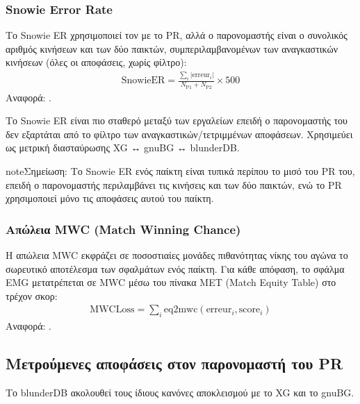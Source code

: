 \documentclass[letterpaper,10pt,greek]{sphinxmanual}
\begin{document}
\subsubsection{Snowie Error Rate}
\label{\detokenize{stats_parity:snowie-error-rate}}
\sphinxAtStartPar
Το Snowie ER χρησιμοποιεί τον  με το PR, αλλά ο παρονομαστής είναι ο συνολικός αριθμός κινήσεων και των δύο παικτών, συμπεριλαμβανομένων των αναγκαστικών κινήσεων (όλες οι αποφάσεις, χωρίς φίλτρο):
\begin{equation*}
\begin{split}\mathrm{SnowieER} = \frac{\sum_i |\mathrm{erreur}_i|}{N_\text{P1} + N_\text{P2}} \times 500\end{split}
\end{equation*}
\sphinxAtStartPar
Αναφορά: .

\sphinxAtStartPar
Το Snowie ER είναι πιο σταθερό μεταξύ των εργαλείων επειδή ο παρονομαστής του δεν εξαρτάται από το φίλτρο των αναγκαστικών/τετριμμένων αποφάσεων. Χρησιμεύει ως μετρική διασταύρωσης XG ↔ gnuBG ↔ blunderDB.

\begin{sphinxadmonition}{note}{Σημείωση:}
\sphinxAtStartPar
Το Snowie ER ενός παίκτη είναι τυπικά περίπου το μισό του PR του, επειδή ο παρονομαστής περιλαμβάνει τις κινήσεις και των δύο παικτών, ενώ το PR χρησιμοποιεί μόνο τις αποφάσεις αυτού του παίκτη.
\end{sphinxadmonition}


\subsubsection{Απώλεια MWC (Match Winning Chance)}
\label{\detokenize{stats_parity:perte-mwc-match-winning-chance}}
\sphinxAtStartPar
Η απώλεια MWC εκφράζει σε ποσοστιαίες μονάδες πιθανότητας νίκης του αγώνα το σωρευτικό αποτέλεσμα των σφαλμάτων ενός παίκτη. Για κάθε απόφαση, το σφάλμα EMG μετατρέπεται σε MWC μέσω του πίνακα MET (Match Equity Table) στο τρέχον σκορ:
\begin{equation*}
\begin{split}\mathrm{MWCLoss} = \sum_i \mathrm{eq2mwc}(\mathrm{erreur}_i, \mathrm{score}_i)\end{split}
\end{equation*}
\sphinxAtStartPar
Αναφορά: .


\subsection{Μετρούμενες αποφάσεις στον παρονομαστή του PR}
\label{\detokenize{stats_parity:decisions-comptees-au-denominateur-du-pr}}
\sphinxAtStartPar
Το blunderDB ακολουθεί τους ίδιους κανόνες αποκλεισμού με το XG και το gnuBG.
\end{document}
